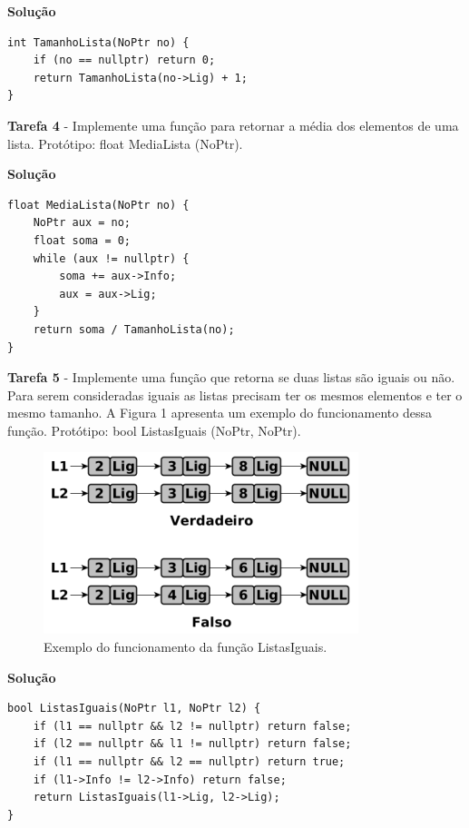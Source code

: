 \documentclass{article}
\begin{document}
\bigskip
\par
\noindent
\textbf{Solução}
\begin{lstlisting}
int TamanhoLista(NoPtr no) {
    if (no == nullptr) return 0;
    return TamanhoLista(no->Lig) + 1;
}
\end{lstlisting}

\bigskip

\par
\noindent
\textbf{Tarefa 4}  - Implemente uma função para retornar a média dos elementos de uma lista.
Protótipo: float MediaLista (NoPtr).

\bigskip
\par
\noindent
\textbf{Solução}
\begin{lstlisting}
float MediaLista(NoPtr no) {
    NoPtr aux = no;
    float soma = 0;
    while (aux != nullptr) {
        soma += aux->Info;
        aux = aux->Lig;
    }
    return soma / TamanhoLista(no);
}
\end{lstlisting}

\bigskip

\par
\noindent
\textbf{Tarefa 5} - Implemente uma função que retorna se duas listas são iguais ou não. Para serem consideradas iguais as listas precisam ter os mesmos elementos e ter o mesmo tamanho. A Figura 1 apresenta um exemplo do funcionamento dessa função.
Protótipo: bool ListasIguais (NoPtr, NoPtr).

\begin{figure}[h!]
	\clearpage
	\centering
	\includegraphics[width=0.6\linewidth]{lista/1.PNG}
	\caption{Exemplo do funcionamento da função ListasIguais.}
\end{figure}

\bigskip
\par
\noindent
\textbf{Solução}
\begin{lstlisting}
bool ListasIguais(NoPtr l1, NoPtr l2) {
    if (l1 == nullptr && l2 != nullptr) return false;
    if (l2 == nullptr && l1 != nullptr) return false;
    if (l1 == nullptr && l2 == nullptr) return true;
    if (l1->Info != l2->Info) return false;
    return ListasIguais(l1->Lig, l2->Lig);
}
\end{lstlisting}
\end{document}
